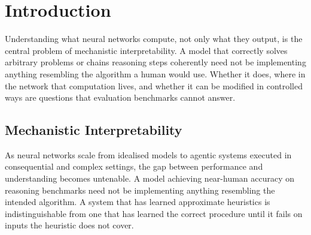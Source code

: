 \chapter{Introduction}
\label{sec:introduction}


Understanding what neural networks compute, not only what they output,
is the central problem of mechanistic interpretability. A model that correctly solves arbitrary problems or chains
reasoning steps coherently need not be implementing anything resembling the algorithm a human would use.
Whether it does, where in the network that computation lives, and whether it can be modified in controlled ways
are questions that evaluation benchmarks cannot answer.

\section{Mechanistic Interpretability}

As neural networks scale from idealised models to agentic systems executed in consequential and complex settings,
the gap between performance and understanding becomes untenable. A model achieving near-human accuracy on reasoning benchmarks
need not be implementing anything resembling the intended algorithm. A system that has learned approximate heuristics is indistinguishable from one that has learned the correct
procedure until it fails on inputs the heuristic does not cover.

